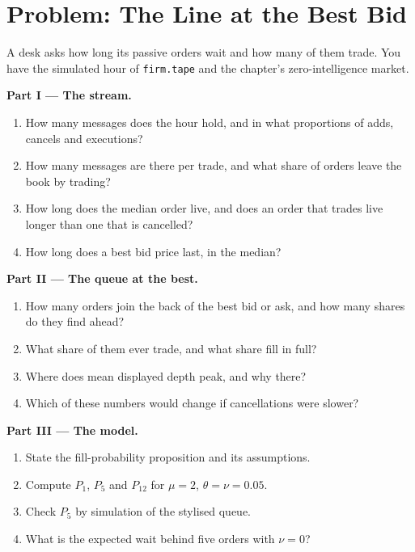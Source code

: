 \section{Problem: The Line at the Best Bid}

\begin{problem}\label{pb:mx:the-limit-order-book:1}
A desk asks how long its passive orders wait and how many of them trade. You have the simulated hour of \texttt{firm.tape} and the chapter's
zero-intelligence market.

\medskip\noindent\textbf{Part I --- The stream.}
\begin{enumerate}
\item How many messages does the hour hold, and in what proportions of adds, cancels and executions?
\item How many messages are there per trade, and what share of orders leave the book by trading?
\item How long does the median order live, and does an order that trades live longer than one that is cancelled?
\item How long does a best bid price last, in the median?
\end{enumerate}

\medskip\noindent\textbf{Part II --- The queue at the best.}
\begin{enumerate}[resume]
\item How many orders join the back of the best bid or ask, and how many shares do they find ahead?
\item What share of them ever trade, and what share fill in full?
\item Where does mean displayed depth peak, and why there?
\item Which of these numbers would change if cancellations were slower?
\end{enumerate}

\medskip\noindent\textbf{Part III --- The model.}
\begin{enumerate}[resume]
\item State the fill-probability proposition and its assumptions.
\item Compute $P_1$, $P_5$ and $P_{12}$ for $\mu=2$, $\theta=\nu=0.05$.
\item Check $P_5$ by simulation of the stylised queue.
\item What is the expected wait behind five orders with $\nu=0$?
\end{enumerate}


\end{problem}
